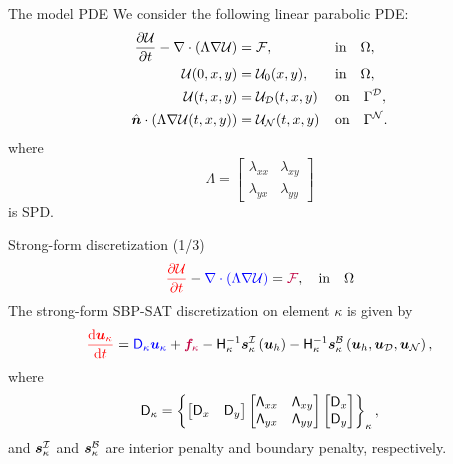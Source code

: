 \documentclass{beamer}
\begin{document}
\begin{frame}{The model PDE}
    We consider the following linear parabolic PDE:
    \begin{equation*}\label{eq:parabolic}
    \begin{aligned}
    \frac{\partial \mathcal{U}}{\partial{t}}- \nabla\cdot\left( \Lambda \nabla \mathcal{U} \right) &= \mathcal{F},\quad &&\text{in} \quad\Omega, \\
    \mathcal{U}(0,x,y)&=\mathcal{U}_{0}(x,y), \quad &&\text{in} \quad\Omega, \\
    \mathcal{U}(t,x,y) &= \mathcal{U}_{\mathcal{D}}(t,x,y) &&\text{on} \quad\Gamma^{\mathcal{D}}, \\
    \hat{\bm{n}} \cdot \left( \Lambda \nabla \mathcal{U}(t,x,y)\right) &= \mathcal{U}_{\mathcal{N}}(t,x,y)
    &&\text{on} \quad \Gamma^{\mathcal{N}}. \\
    \end{aligned}
    \end{equation*}
    where
    \begin{equation*}
    \Lambda = \begin{bmatrix}
    \lambda_{xx} & \lambda_{xy} \\ \lambda_{yx} & \lambda_{yy}
    \end{bmatrix}
    \end{equation*}
    is SPD.
\end{frame}

\begin{frame}{Strong-form discretization (1/3)}
    \begin{equation*}
    {\color{red}\frac{\partial \ensuremath{\mathcal{U}}}{\partial{t}}}- {\color{blue}\nabla\cdot\left( \Lambda \nabla \mathcal{U} \right)} = {\color{purple}\mathcal{F}},\quad \text{in} \quad\Omega
    \end{equation*}
    \vskip 5mm
The strong-form SBP-SAT discretization on element $\kappa$ is given by
\begin{equation*}
{\color{red}\frac{\mathrm{d}\bm{u}_{\kappa}}{\mathrm{d}t}} = {\color{blue}\mathsf{D}_\kappa\bm{u}_{\kappa}} + {\color{purple}\bm{f}_\kappa }
-\mathsf{H}_{\kappa}^{-1}\bm{s}_{\kappa}^{\mathcal{I}}\left(\bm{u}_{h}\right) 
-\mathsf{H}_{\kappa}^{-1}\bm{s}_{\kappa}^{\mathcal{B}}\left(\bm{u}_{h}, \bm{u}_{\mathcal{D}}, \bm{u}_{\mathcal{N}}\right),
\end{equation*}
where 
\begin{equation*}
\mathsf{D}_\kappa = \left\{ \begin{bmatrix} \mathsf{D}_{x} & \mathsf{D}_{y} \end{bmatrix}
\begin{bmatrix} \mathsf{\Lambda}_{xx} & \mathsf{\Lambda}_{xy} \\ \mathsf{\Lambda}_{yx} & \mathsf{\Lambda}_{yy} \end{bmatrix}
\begin{bmatrix} \mathsf{D}_{x} \\ \mathsf{D}_{y} \end{bmatrix} \right\}_{\kappa},
\end{equation*}
and 
$\bm{s}^{\mathcal{I}}_{\kappa}$ and $\bm{s}^{\mathcal{B}}_{\kappa}$ are interior penalty and boundary penalty, respectively.   
\end{frame}
\end{document}
